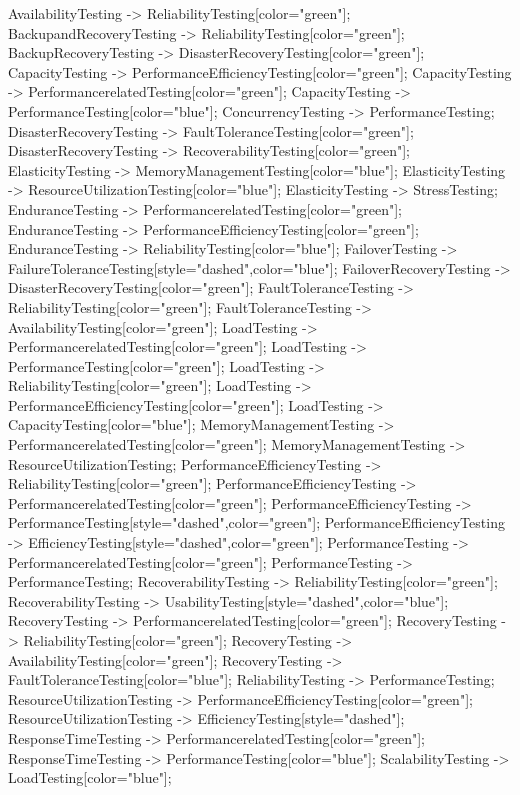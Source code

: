 \documentclass{article}
\begin{document}
{AvailabilityTesting -> ReliabilityTesting[color="green"];
BackupandRecoveryTesting -> ReliabilityTesting[color="green"];
BackupRecoveryTesting -> DisasterRecoveryTesting[color="green"];
CapacityTesting -> PerformanceEfficiencyTesting[color="green"];
CapacityTesting -> PerformancerelatedTesting[color="green"];
CapacityTesting -> PerformanceTesting[color="blue"];
ConcurrencyTesting -> PerformanceTesting;
DisasterRecoveryTesting -> FaultToleranceTesting[color="green"];
DisasterRecoveryTesting -> RecoverabilityTesting[color="green"];
ElasticityTesting -> MemoryManagementTesting[color="blue"];
ElasticityTesting -> ResourceUtilizationTesting[color="blue"];
ElasticityTesting -> StressTesting;
EnduranceTesting -> PerformancerelatedTesting[color="green"];
EnduranceTesting -> PerformanceEfficiencyTesting[color="green"];
EnduranceTesting -> ReliabilityTesting[color="blue"];
FailoverTesting -> FailureToleranceTesting[style="dashed",color="blue"];
FailoverRecoveryTesting -> DisasterRecoveryTesting[color="green"];
FaultToleranceTesting -> ReliabilityTesting[color="green"];
FaultToleranceTesting -> AvailabilityTesting[color="green"];
LoadTesting -> PerformancerelatedTesting[color="green"];
LoadTesting -> PerformanceTesting[color="green"];
LoadTesting -> ReliabilityTesting[color="green"];
LoadTesting -> PerformanceEfficiencyTesting[color="green"];
LoadTesting -> CapacityTesting[color="blue"];
MemoryManagementTesting -> PerformancerelatedTesting[color="green"];
MemoryManagementTesting -> ResourceUtilizationTesting;
PerformanceEfficiencyTesting -> ReliabilityTesting[color="green"];
PerformanceEfficiencyTesting -> PerformancerelatedTesting[color="green"];
PerformanceEfficiencyTesting -> PerformanceTesting[style="dashed",color="green"];
PerformanceEfficiencyTesting -> EfficiencyTesting[style="dashed",color="green"];
PerformanceTesting -> PerformancerelatedTesting[color="green"];
PerformanceTesting -> PerformanceTesting;
RecoverabilityTesting -> ReliabilityTesting[color="green"];
RecoverabilityTesting -> UsabilityTesting[style="dashed",color="blue"];
RecoveryTesting -> PerformancerelatedTesting[color="green"];
RecoveryTesting -> ReliabilityTesting[color="green"];
RecoveryTesting -> AvailabilityTesting[color="green"];
RecoveryTesting -> FaultToleranceTesting[color="blue"];
ReliabilityTesting -> PerformanceTesting;
ResourceUtilizationTesting -> PerformanceEfficiencyTesting[color="green"];
ResourceUtilizationTesting -> EfficiencyTesting[style="dashed"];
ResponseTimeTesting -> PerformancerelatedTesting[color="green"];
ResponseTimeTesting -> PerformanceTesting[color="blue"];
ScalabilityTesting -> LoadTesting[color="blue"];
}
\end{document}
